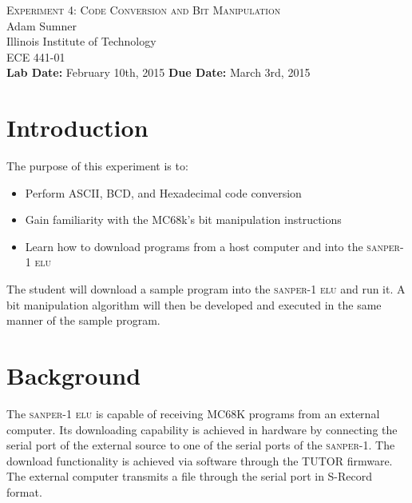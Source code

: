 \documentclass[12pt, twocolumn]{article}
\newcommand{\sanper}{\textsc{sanper-1 elu} }
\begin{document}
\begin{titlepage}
	\begin{center}
		
		
		\vfill
		
		\textsc{\LARGE Experiment 4: Code Conversion and Bit Manipulation}\\[1.5cm]
		
		\Large Adam Sumner\\[0.5cm]
		
		\Large Illinois Institute of Technology\\[0.5cm]
		
		\Large ECE 441-01\\[0.5cm]	
		\noindent
		\vfill
		\large \textbf{Lab Date:} February 10th, 2015\hfill
		\large \textbf{Due Date:} March 3rd, 2015
		
		
	\end{center}
\end{titlepage}

\section{Introduction}
The purpose of this experiment is to:
\begin{itemize}
	\item Perform ASCII, BCD, and Hexadecimal code conversion
	\item Gain familiarity with the MC68k's bit manipulation instructions
	\item Learn how to download programs from a host computer and into the \sanper
\end{itemize}
The student will download a sample program into the \sanper and run it. A bit manipulation algorithm will then be developed and executed in the same manner of the sample program.
\section{Background}
The \sanper is capable of receiving MC68K programs from an external computer. Its downloading capability is achieved in hardware by connecting the serial port of the external source to one of the serial ports of the \textsc{sanper-1}. The download functionality is achieved via software through the TUTOR firmware. The external computer transmits a file through the serial port in S-Record format. 
\end{document}
